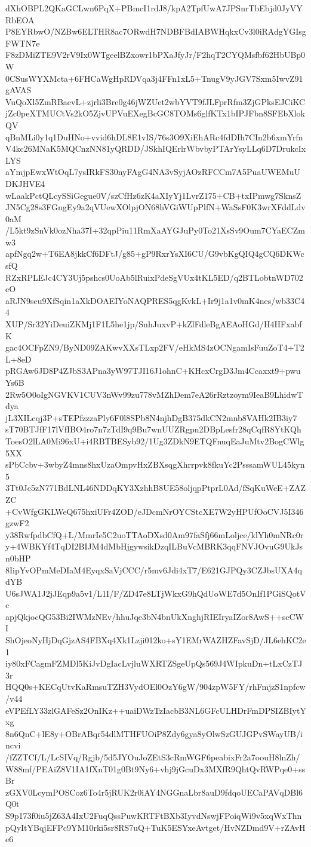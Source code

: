 dXhOBPL2QKaGCLwn6PqX+PBmcI1rdJ8/kpA2TpfUwA7JPSnrTbEbjd0JyVYRbEOA
P8EYRbwO/NZBw6ELTHR8ac7ORwdH7NDBFBdIABWHqkxCv3l0iRAdgYGIsgFWTN7e
F8zDMiZTE9V2rV9Ix0WTgeelBZxowr1bPXaJfyJr/F2hqT2CYQMsfbf62HbUBp0W
0CSusWYXMcta+6FHCaWgHpRDVqa3j4FFn1xL5+TnugV9yJGV7Sxm5IwvZ91gAVAS
VuQoXl5ZmRBaevL+zjrli3Bre0g46jWZUet2wbYVT9fJLFprRfm3ZjGPksEJCiKC
jZc0peXTMUCtVs2kO5ZjvUPVuEXegBcGC8TOMs6glfKTx1bIPJFbn8SFEbXlokQV
qBnMLi0y1q1DuHNo+vvid6hDL8E1vIS/76s3O9XiEhARc4fdDIh7CIn2b6xmYrfn
V4kc26MNaK5MQCnzNN81yQRDD/JSkhIQErlrWbvbyPTArYsyLLq6D7DrukcIxLYS
aYmjpEwxWtOqL7ysIRkFS30nyFAgG4NA3vSyjAOzRFCCm7A5PuaUWEMuUDKJHVE4
wLaakPctQLcySSiGegue0V/szCfHz6zK4aXIyYj1LvrZ175+CB+txIPmwg7SknsZ
JN5Cg28s3FGngEy9a2qVUewXOlpjON68hVGiWUpPlfN+WaSsF0K3wrXFddLdv0aM
/L5kt9zSnVk0ozNha37I+32qpPiu11RmXaAYGJuPy0To21XsSv9Oum7CYaECZmw3
apfNgq2w+T6EA8jkkCf6DFtJ/g85+gP9RxrYsXI6CU/G9vbKgQIQ4gCQ6DKWcsfQ
RZxRPLEJc4CY3Uj5pshcs0UoAb5lRuixPdeSgVUx4tKL5ED/q2BTLobtnWD702eO
aRJN9seu9XfSqin1aXkDOAEIYoNAQPRES5qgKvkL+Ir9j1a1v0mK4nes/wb33C44
XUP/Sr32YiDeuiZKMj1F1L5he1jp/SnhJuxvP+kZlFdleBgAEAoHGd/H4HFxabfK
gac4OCFpZN9/ByND09ZAKwvXXsTLxp2FV/eHkMS4zOCNgamIsFuuZoT4+T2L+8eD
pRGAw6JD8P4ZJbS3APna3yW97TJI16J1ohnC+KHcxCrgD3Jm4Ccaxxt9+pwuYs6B
2Rw5O0oIgNGVKV1CUV3nWv99zu778vMZhDem7eA26rRztzoym9IeaB9LhidwTdya
jL3XILcqj3P+sTEPfzzzaPly6F0l8SPb8N4njhDgB375dkCN2mnb8VAHk2IB3iy7
sT70BTJfF17lVfIBO4ro7n7zTdI9q9Bu7wnUUZRgpn2DBpLesfr28qCqfR8YtKQh
ToesO2lLA0Mi96xU+i4RBTBESyb92/1Ug3ZDkN9ETQFnuqEaJuMtv2BogCWlg5XX
sPbCcbv+3wbyZ4mns8hxUzaOmpvHxZBXsqgXhrrpvk8fkuYc2PsssamWUL45kyn5
3Tt0Jc5zN771BdLNL46NDDqKY3XzhhB8UE58oljqpPtprL0Ad/fSqKuWeE+ZAZZC
+CvWfgGKLWeQ675hxiUFr4ZOD/eJDcmNrOYCStcXE7W2yHPUfOoCVJ5I346gzwF2
y38RwfpdbCfQ+L/MmrIe5C2uoTTAoDXsd0Am97faSfj66mLoljce/klYh0mNRc0r
y+4WBKYf4TqDI2BIJM4dMbHjgywsikDzqILBuVcMBRK3qqFNVJOvuG9UkJsn0bHP
8IipYvOPmMeDIaM4EyqxSaVjCCC/r5mv6Jdi4xT7/E621GJPQy3CZJbsUXA4qdYB
U6sJWA1J2jJEqp9a5v1/L1I/F/ZD47e8LTjWkxG9hQdUoWE7d5OnIf1PGiSQotVc
apjQkjocQG53Bi2IWMzNEv/hhuJqe3bN4bnUkXnghjRIEIryaIZor8AwS++scCWI
ShOjeoNyHjDqGjzAS4FBXq4Xk1Lzji012ko+sY1EMrWAZHZFavSjD/JL6ehKC2e1
iy80xFCagmFZMDl5KiJvDgIacLvjluWXRTZSgeUpQs569J4WIpkuDn+tLxCzTJ3r
HQQ0s+KECqUtvKaRmsuTZH3VydOEl0OzY6gW/904zpW5FY/rhFmjzS1npfcw/v44
eVPEfLY33zlGAFeSz2OnIKz++uaiDWzTzIacbB3NL6GFcULHDrFmDPSIZBIytYxg
8n6QnC+lE8y+OBrABqr54dlMTHFUOiP8Zdy6gya8yOlwSzGUJGPvSWayUB/incvi
/fZZTCf/L/LcSIVq/Rgjb/5d5JYOuJoZEtS3cRmWGF6peabixFr2a7oouH8lnZh/
W88mf/PEAiZ8V1IA1fXnT01g0Bt9Ny6+vhj9jGcuDx3MXfR9QhtQvRWPqe0+ssBr
zGXV0LcymPOSCoz6To4r5jRUK2r0iAY4NGGnaLbr8auD9fdqoUECaPAVqDBl6Q0t
S9p173f0iu5jZ63A4IxU2FuqQssPuwKRTFtBXb3IyvdNswjFPoiqWi9v5xqWxThn
pQyItYBqjEFPc9YM10rki5sr8RS7uQ+TuK5ESYxeAvtget/HvNZDmd9V+rZAvHe6
